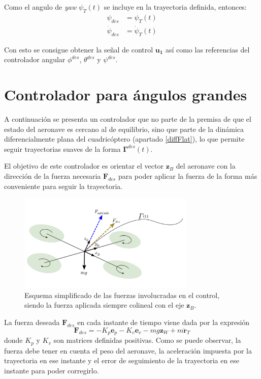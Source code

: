 Como el angulo de \textit{yaw} $\psi_T(t)$ se incluye en la trayectoria definida, entonces:
\begin{align}
	\psi_{des} &= \psi_T(t)\\
		\dot\psi_{des} &= \dot\psi_T(t)
\end{align} 

Con esto se consigue obtener la señal de control $\mathbf{u_1}$ así como las referencias del controlador angular $\phi^{des}$, $\theta^{des}$ y $\psi^{des}$.

\section{Controlador para ángulos grandes}
A continuación se presenta un controlador que no parte de la premisa de que el estado del aeronave es cercano al de equilibrio, sino que parte de la dinámica diferencialmente plana del cuadricóptero (apartado \ref{diffFlat}), lo que permite seguir trayectorias suaves de la forma $\mathbf{\Gamma}^{des}(t)$.

El objetivo de este controlador es orientar el vector $\mathbf{z}_B$ del aeronave con la dirección de la fuerza necesaria $\mathbf{F}_{des}$ para poder aplicar la fuerza de la forma más conveniente para seguir la trayectoria.
\begin{figure}[htb!]
	\centering
	\includegraphics[width=0.75\textwidth]{imagenes/control2}
	\caption{Esquema simplificado de las fuerzas involucradas en el control, siendo la fuerza aplicada siempre colineal con el eje $\mathbf{z}_B$. }
	\label{modelado:uav_coordinte}
\end{figure}


La fuerza deseada $\mathbf{F}_{des}$ en cada instante de tiempo viene dada por la expresión
\begin{equation}
	\mathbf{F}_{des} = -K_p	\mathbf{e}_p - K_v	\mathbf{e}_v - mg	\mathbf{z}_W + m	\mathbf{\ddot r}_T
\end{equation}
donde $K_p$ y $K_v$ son matrices definidas positivas.
Como se puede observar, la fuerza debe tener en cuenta el peso del aeronave, la aceleración impuesta por la trayectoria en ese instante y el error de seguimiento de la trayectoria en ese instante para poder corregirlo.

